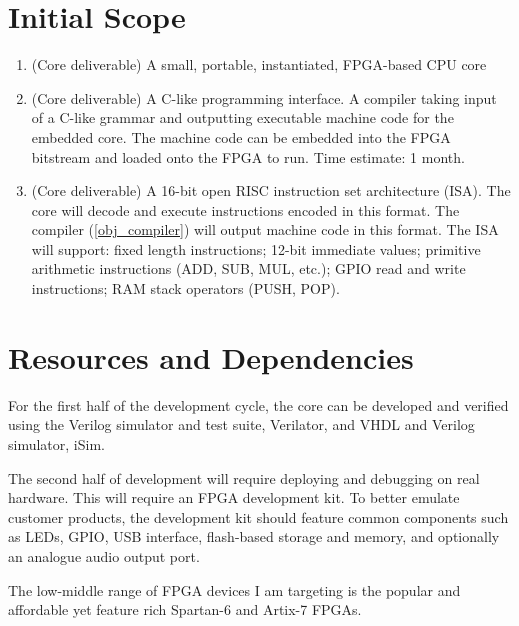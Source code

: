 \documentclass[11pt,a4paper]{article}
\begin{document}
\section{Initial Scope}

\begin{enumerate}
\item{(Core deliverable) A small, portable, instantiated, FPGA-based CPU core}
\item{(Core deliverable) A C-like programming interface. A compiler taking input of a C-like grammar and outputting executable machine code for the embedded core. The machine code can be embedded into the FPGA bitstream and loaded onto the FPGA to run. Time estimate: 1 month.}\label{obj_compiler}
\item{(Core deliverable) A 16-bit open RISC instruction set architecture (ISA). The core will decode and execute instructions encoded in this format. The compiler (\ref{obj_compiler}) will output machine code in this format. The ISA will support: fixed length instructions; 12-bit immediate values; primitive arithmetic instructions (ADD, SUB, MUL, etc.); GPIO read and write instructions; RAM stack operators (PUSH, POP).}
\end{enumerate}

\section{Resources and Dependencies}
For the first half of the development cycle, the core can be developed and verified using the Verilog simulator and test suite, Verilator, and VHDL and Verilog simulator, iSim.

The second half of development will require deploying and debugging on real hardware. This will require an FPGA development kit. To better emulate customer products, the development kit should feature common components such as LEDs, GPIO, USB interface, flash-based storage and memory, and optionally an analogue audio output port.

The low-middle range of FPGA devices I am targeting is the popular and affordable yet feature rich Spartan-6 and Artix-7 FPGAs.
\end{document}
